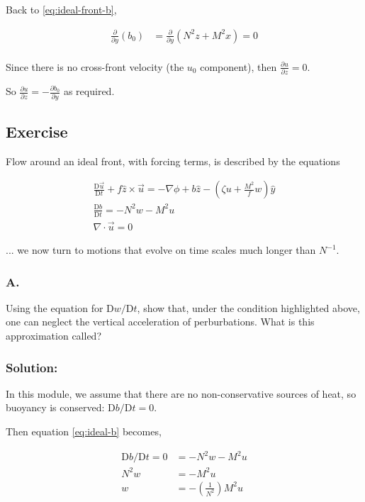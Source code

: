 \documentclass[12 pt]{article}
\numberwithin{equation}{section} %
\begin{document}
Back to \ref{eq:ideal-front-b},

\begin{align*}
  \frac{\partial}{\partial y}(b_0) &= \frac{\partial}{\partial y}(N^2 z + M^2 x) = 0 \\
\end{align*}

Since there is no cross-front velocity (the $u_0$ component), then $\frac{\partial u}{\partial z} = 0$.

So $\frac{\partial u}{\partial z} = -\frac{\partial b_0}{\partial y}$ as required.


\subsection{Exercise}
Flow around an ideal front, with forcing terms, is described by the equations

\begin{align}
  \frac{\text{D}\vec u}{\text{D}t} + f \hat z \times \vec u = -\nabla \phi + b\hat z - \left (\zeta u + \frac{M^2}{f}w\right )\hat y \label{eq:ideal-u} \\
  \frac{\text{D}b}{\text{D}t} = -N^2 w - M^2 u  \label{eq:ideal-b} \\
  \nabla \cdot \vec u = 0  \label{eq:continuity}
\end{align}

... we now turn to motions that evolve on time scales much longer than $N^{-1}$.

\subsubsection*{A.} Using the equation for $\text{D}w/\text{D}t$, show that, under the condition highlighted above, one can neglect the vertical acceleration of perburbations. What is this approximation called? \\

\subsubsection*{Solution:}
In this module, we assume that there are no non-conservative sources of heat, so buoyancy is conserved: $\text{D}b/\text{D}t = 0$.

Then equation \ref{eq:ideal-b} becomes,

\begin{align*}
  \text{D}b/\text{D}t = 0 &= -N^2 w - M^2 u \\
  N^2 w &= -M^2 u \\
  w &= -\left(\frac{1}{N^2} \right) M^2 u
\end{align*}
\end{document}
